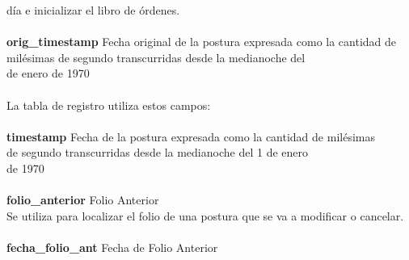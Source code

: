 \documentclass[10pt]{article}
\begin{document}
\begin{tabbing}
día e inicializar el libro de órdenes.\\
\\
\textbf{orig\_timestamp} \> Fecha original de la postura expresada como la cantidad de\\
\> milésimas de segundo transcurridas desde la medianoche del\\
 de enero de 1970\\
\\
La tabla de registro utiliza estos campos:\\
\\
\textbf{timestamp} \> Fecha de la postura expresada como la cantidad de milésimas\\
\> de segundo transcurridas desde la medianoche del 1 de enero\\
\>de 1970\\
\\
\textbf{folio\_anterior} \> Folio Anterior\\
Se utiliza para localizar el folio de una postura que se va a modificar o cancelar.\\
\\
\textbf{fecha\_folio\_ant} \> Fecha de Folio Anterior\\
\end{tabbing}
\end{document}
